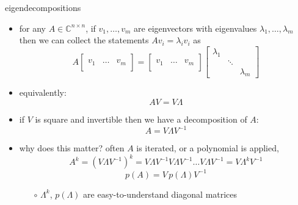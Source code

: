 \documentclass[10pt,hyperref]{beamer}
\newcommand{\CC}{\mathbb{C}}
\newcommand{\trefmatrixtwo}[2]{\left[\begin{array}{c|c|c} & & \\ #1 & \dots & #2 \\ & & \end{array}\right]}
\begin{document}
\begin{frame}{eigendecompositions}

\begin{itemize}
\item for any $A\in\CC^{n\times n}$, if $v_1,\dots,v_m$ are eigenvectors with eigenvalues $\lambda_1,\dots,\lambda_m$ then we can collect the statements $A v_i=\lambda_i v_i$ as
\small
    $$A \trefmatrixtwo{v_1}{v_m} =  \trefmatrixtwo{v_1}{v_m} \begin{bmatrix} \lambda_1 & & \\ & \ddots & \\ & & \lambda_m \end{bmatrix}$$
\normalsize
\item equivalently:
    $$A V = V \Lambda$$
\item if $V$ is square and invertible then we have a decomposition of $A$:
    $$A = V \Lambda V^{-1}$$
\item why does this matter?  often $A$ is iterated, or a polynomial is applied,
    $$A^k = (V \Lambda V^{-1})^k = V \Lambda V^{-1}V \Lambda V^{-1}\dots V \Lambda V^{-1} = V \Lambda^k V^{-1}$$
    $$p(A) = V\, p(\Lambda) V^{-1}$$

    \begin{itemize}
    \item[$\circ$] $\Lambda^k$, $p(\Lambda)$ are easy-to-understand diagonal matrices
    \end{itemize}
\end{itemize}
\end{frame}
\end{document}
